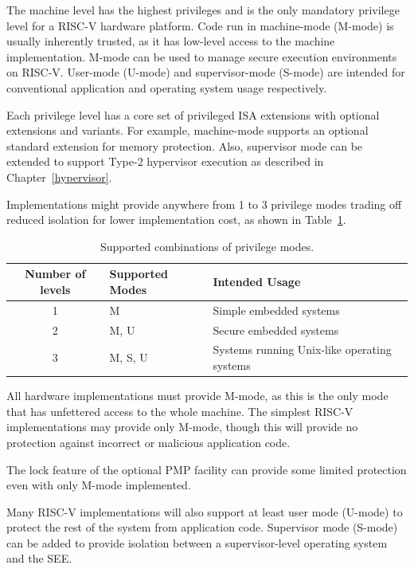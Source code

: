 The machine level has the highest privileges and is the only mandatory
privilege level for a RISC-V hardware platform.  Code run in
machine-mode (M-mode) is usually inherently trusted, as it has
low-level access to the machine implementation.  M-mode can be used to
manage secure execution environments on RISC-V.  User-mode (U-mode)
and supervisor-mode (S-mode) are intended for conventional application
and operating system usage respectively.

Each privilege level has a core set of privileged ISA extensions with optional
extensions and variants.  For example, machine-mode supports an optional
standard extension for memory protection.  Also, supervisor mode can be
extended to support Type-2 hypervisor execution as described in
Chapter~\ref{hypervisor}.

Implementations might provide anywhere from 1 to 3 privilege modes
trading off reduced isolation for lower implementation cost, as shown
in Table~\ref{privcombs}.

\begin{table}[h!]
\begin{center}
\begin{tabular}{|c|l|l|}
  \hline
   Number of levels &  Supported Modes & Intended Usage \\ \hline  
   1     & M          & Simple embedded systems \\ 
   2     & M, U       & Secure embedded systems \\ 
   3     & M, S, U    & Systems running Unix-like operating systems\\ 
  \hline
 \end{tabular}
\end{center}
\caption{Supported combinations of privilege modes.}
\label{privcombs}
\end{table}

All hardware implementations must provide M-mode, as this is the only
mode that has unfettered access to the whole machine.  The simplest
RISC-V implementations may provide only M-mode, though this will
provide no protection against incorrect or malicious application code.

\begin{commentary}
  The lock feature of the optional PMP facility can provide some
  limited protection even with only M-mode implemented.
\end{commentary}

Many RISC-V implementations will also support at least user mode
(U-mode) to protect the rest of the system from application code.
Supervisor mode (S-mode) can be added to provide isolation between a
supervisor-level operating system and the SEE.

